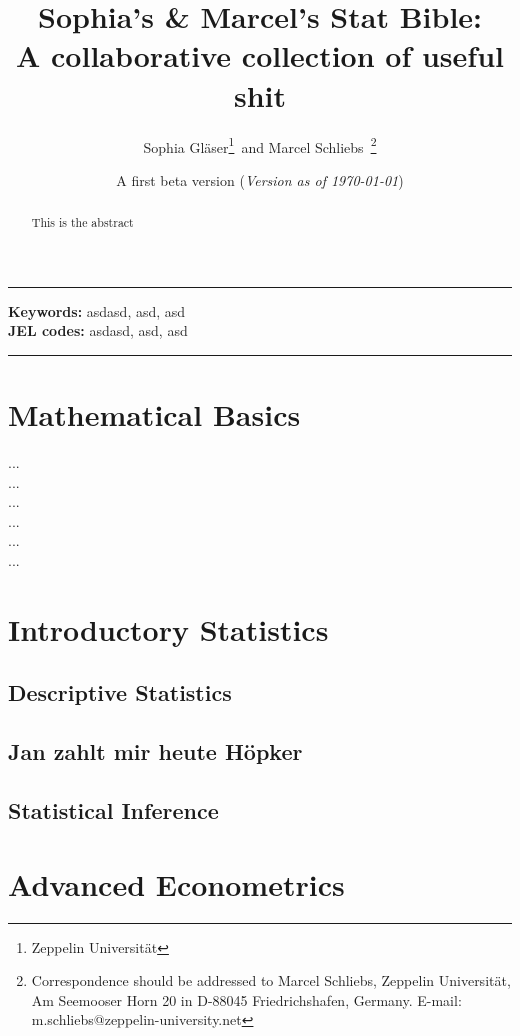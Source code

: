 \documentclass[14pt, a4paper]{article}
\title{Sophia's \& Marcel's Stat Bible:\\ A collaborative collection of useful shit}
\author{Sophia Gläser\thanks{Zeppelin Universität}\ and 
Marcel Schliebs\footnotemark[2]\
 \thanks{Correspondence should be addressed to Marcel Schliebs, Zeppelin Universität, Am Seemooser Horn 20 in D-88045 Friedrichshafen, Germany. E-mail: m.schliebs@zeppelin-university.net}}
\date{A first beta version (\textit{Version as of \today})}
\begin{document}
\maketitle

\rule{\linewidth}{0.4pt}
\begin{abstract}
This is the abstract
\end{abstract}
\textbf{Keywords:} asdasd, asd, asd\\
\medskip
\textbf{JEL codes:} asdasd, asd, asd\\
\rule{\linewidth}{0.4pt}


\maketitle

\tableofcontents
\newpage


\section{Mathematical Basics}

...\\
...\\
...\\
...\\
...\\
...\\

\section{Introductory Statistics}

\subsection{Descriptive Statistics}

\subsection{Jan zahlt mir heute Höpker}

\subsection{Statistical Inference}

\section{Advanced Econometrics}
\end{document}
